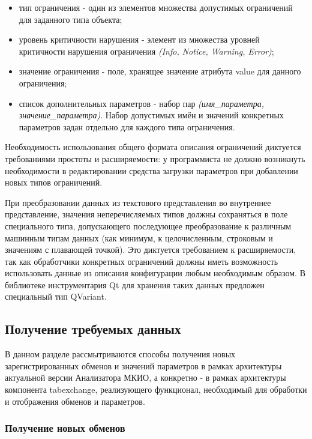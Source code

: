 \begin{itemize}
 \item тип ограничения - один из элементов множества допустимых ограничений для 
заданного типа объекта;
 \item уровень критичности нарушения - элемент из множества уровней критичности 
нарушения ограничения \textit{(Info, Notice, Warning, Error)};
 \item значение ограничения - поле, хранящее значение атрибута value для 
данного ограничения;
 \item список дополнительных параметров - набор пар \textit{(имя\_параметра, 
значение\_параметра)}. Набор допустимых имён и значений конкретных параметров 
задан отдельно для каждого типа ограничения.
\end{itemize}

Необходимость использования общего формата описания ограничений диктуется 
требованиями простоты и расширяемости: у программиста не должно возникнуть 
необходимости в редактировании средства загрузки параметров при добавлении 
новых типов ограничений.

При преобразовании данных из текстового представления во внутреннее 
представление, значения неперечисляемых типов должны сохраняться в поле 
специального типа, допускающего последующее преобразование к различным машинным 
типам данных (как минимум, к целочисленным, строковым и значениям с плавающей 
точкой). Это диктуется требованием к расширяемости, так как обработчики 
конкретных ограничений должны иметь возможность использовать данные из описания 
конфигурации любым необходимым образом. В библиотеке инструментария Qt для 
хранения таких данных предложен специальный тип QVariant.

\subsection{Получение требуемых данных}

В данном разделе рассмытриваются способы получения новых 
зарегистрированных обменов и значений параметров в рамках архитектуры 
актуальной версии Анализатора МКИО, а конкретно - в рамках архитектуры 
компонента tabexchange, реализующего функционал, необходимый для обработки и 
отображения обменов и параметров.

\subsubsection{Получение новых обменов}

